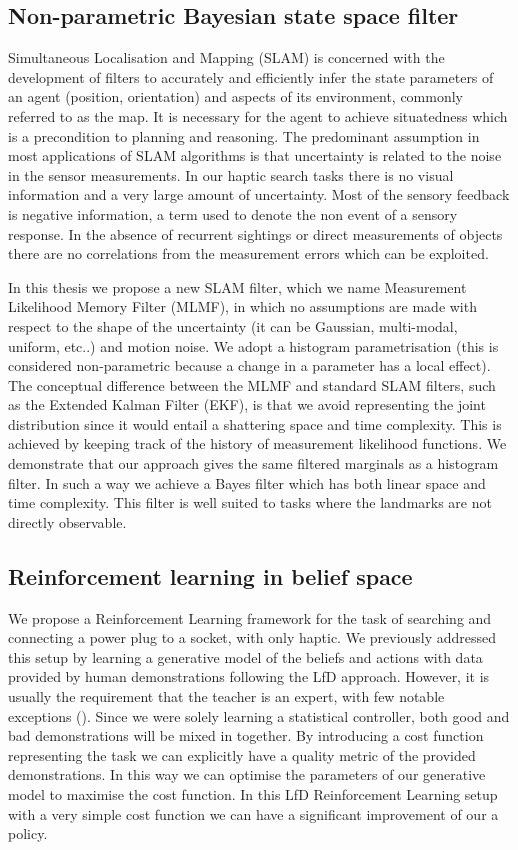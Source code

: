 \subsection{Non-parametric Bayesian state space filter}

Simultaneous Localisation and Mapping (SLAM) is concerned with the development of filters to accurately and efficiently infer 
the state parameters of an agent (position, orientation) and aspects of its environment, commonly referred to as the map. 
It is necessary for the agent to achieve situatedness which is a precondition to planning and reasoning. The 
predominant assumption in most applications of SLAM algorithms is that uncertainty is related to the noise in the sensor measurements. In 
our haptic search tasks there is no visual information and a very large amount of uncertainty. Most of the sensory
feedback is negative information, a term used to denote the non event of a sensory response.
In the absence of recurrent sightings or direct measurements of objects there are no correlations from the measurement errors 
which can be exploited. 

In this thesis we propose a new SLAM filter, which we name Measurement Likelihood Memory Filter (MLMF), in 
which no assumptions are made with respect to the shape of the uncertainty (it can be Gaussian, multi-modal, uniform, etc..) and 
motion noise. We adopt a histogram parametrisation (this is considered non-parametric because a change in a parameter has a local effect). 
The conceptual difference between the MLMF and standard SLAM filters, 
such as the Extended Kalman Filter (EKF), is that we avoid representing the joint distribution since it would entail a shattering space and time complexity. 
This is achieved by keeping track of the history of measurement likelihood functions. We demonstrate that our approach gives 
the same filtered marginals as a histogram filter. In such a way we achieve a Bayes filter which has both linear space and 
time complexity. This filter is well suited to tasks where the landmarks are not directly observable.

\subsection{Reinforcement learning in belief space}

We propose a Reinforcement Learning framework for the task of searching and connecting a power plug to a socket, with only haptic. 
We previously addressed this setup by learning a generative model of the beliefs and actions with data 
provided by human demonstrations following the LfD approach. However, it is usually the requirement that 
the teacher is an expert, with few notable exceptions (\cite{rai2013learning}). Since we were solely learning a 
statistical controller, both good and bad demonstrations will be mixed in together. By introducing a cost function 
representing the task we can explicitly have a quality metric of the provided demonstrations. In this way 
we can optimise the parameters of our generative model to maximise the cost function. In this LfD Reinforcement 
Learning setup with a very simple cost function we can have a significant improvement of our a policy.


